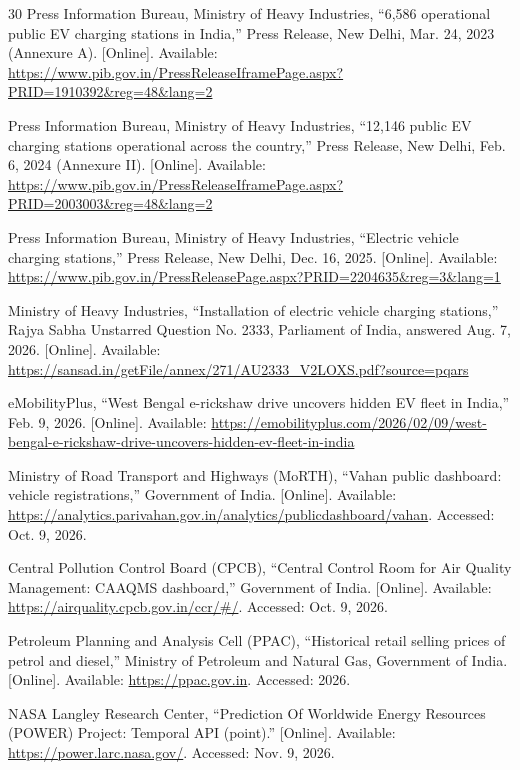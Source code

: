 \begin{thebibliography}{30}\setlength{\itemsep}{0pt}
 Press Information Bureau, Ministry of Heavy Industries, ``6,586 operational public EV charging stations in India,'' Press Release, New Delhi, Mar. 24, 2023 (Annexure A). [Online]. Available: \url{https://www.pib.gov.in/PressReleaseIframePage.aspx?PRID=1910392&reg=48&lang=2}

 Press Information Bureau, Ministry of Heavy Industries, ``12,146 public EV charging stations operational across the country,'' Press Release, New Delhi, Feb. 6, 2024 (Annexure II). [Online]. Available: \url{https://www.pib.gov.in/PressReleaseIframePage.aspx?PRID=2003003&reg=48&lang=2}

 Press Information Bureau, Ministry of Heavy Industries, ``Electric vehicle charging stations,'' Press Release, New Delhi, Dec. 16, 2025. [Online]. Available: \url{https://www.pib.gov.in/PressReleasePage.aspx?PRID=2204635&reg=3&lang=1}

 Ministry of Heavy Industries, ``Installation of electric vehicle charging stations,'' Rajya Sabha Unstarred Question No. 2333, Parliament of India, answered Aug. 7, 2026. [Online]. Available: \url{https://sansad.in/getFile/annex/271/AU2333_V2LOXS.pdf?source=pqars}

 eMobilityPlus, ``West Bengal e-rickshaw drive uncovers hidden EV fleet in India,'' Feb. 9, 2026. [Online]. Available: \url{https://emobilityplus.com/2026/02/09/west-bengal-e-rickshaw-drive-uncovers-hidden-ev-fleet-in-india}

 Ministry of Road Transport and Highways (MoRTH), ``Vahan public dashboard: vehicle registrations,'' Government of India. [Online]. Available: \url{https://analytics.parivahan.gov.in/analytics/publicdashboard/vahan}. Accessed: Oct. 9, 2026.

 Central Pollution Control Board (CPCB), ``Central Control Room for Air Quality Management: CAAQMS dashboard,'' Government of India. [Online]. Available: \url{https://airquality.cpcb.gov.in/ccr/#/}. Accessed: Oct. 9, 2026.

 Petroleum Planning and Analysis Cell (PPAC), ``Historical retail selling prices of petrol and diesel,'' Ministry of Petroleum and Natural Gas, Government of India. [Online]. Available: \url{https://ppac.gov.in}. Accessed: 2026.

 NASA Langley Research Center, ``Prediction Of Worldwide Energy Resources (POWER) Project: Temporal API (point).'' [Online]. Available: \url{https://power.larc.nasa.gov/}. Accessed: Nov. 9, 2026.


\end{thebibliography}
